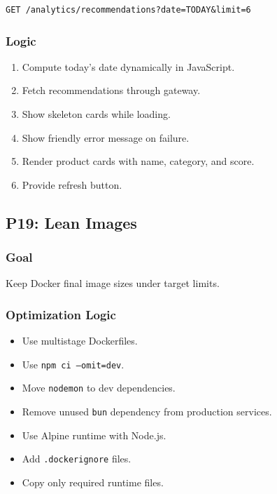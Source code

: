 \documentclass[11pt,a4paper]{article}
\begin{document}
\begin{lstlisting}
GET /analytics/recommendations?date=TODAY&limit=6
\end{lstlisting}

\subsubsection*{Logic}

\begin{enumerate}
  \item Compute today's date dynamically in JavaScript.
  \item Fetch recommendations through gateway.
  \item Show skeleton cards while loading.
  \item Show friendly error message on failure.
  \item Render product cards with name, category, and score.
  \item Provide refresh button.
\end{enumerate}

\subsection{P19: Lean Images}

\subsubsection*{Goal}
Keep Docker final image sizes under target limits.

\subsubsection*{Optimization Logic}

\begin{itemize}
  \item Use multistage Dockerfiles.
  \item Use \texttt{npm ci --omit=dev}.
  \item Move \texttt{nodemon} to dev dependencies.
  \item Remove unused \texttt{bun} dependency from production services.
  \item Use Alpine runtime with Node.js.
  \item Add \texttt{.dockerignore} files.
  \item Copy only required runtime files.
\end{itemize}
\end{document}
